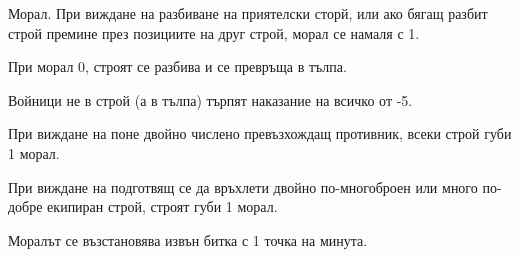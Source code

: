 Морал. При виждане на разбиване на приятелски сторй, или ако бягащ разбит строй премине през позициите на друг строй, морал се намаля с 1.

При морал 0, строят се разбива и се превръща в тълпа.

Войници не в строй (а в тълпа) търпят наказание на всичко от -5.

При виждане на поне двойно числено превъзхождащ противник, всеки строй губи 1 морал.

При виждане на подготвящ се да връхлети двойно по-многоброен или много по-добре екипиран строй, строят губи 1 морал.

Моралът се възстановява извън битка с 1 точка на минута.
